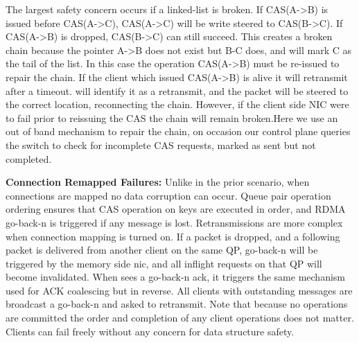 The largest safety concern occurs if a linked-list is broken.  If CAS(A->B) is
issued before CAS(A->C), CAS(A->C) will be write steered to CAS(B->C). If
CAS(A->B) is dropped, CAS(B->C) can still succeed. This creates a broken chain
because the pointer A->B does not exist but B-C does, and {\sword} will mark C
as the tail of the list. In this case the operation CAS(A->B) must be re-issued
to repair the chain.  If the client which issued CAS(A->B) is alive it will
retransmit after a timeout. {\sword} will identify it as a retransmit, and the
packet will be steered to the correct location, reconnecting the chain. However,
if the client side NIC were to fail prior to reissuing the CAS the chain will
remain broken.Here we use an out of band mechanism to repair the chain, on
occasion our control plane queries the switch to check for incomplete CAS
requests, marked as sent but not completed.

\textbf{Connection Remapped Failures:} Unlike in the prior scenario, when
connections are mapped no data corruption can occur. Queue pair operation
ordering ensures that CAS operation on keys are executed in order, and RDMA
go-back-n is triggered if any message is lost.  Retransmissions are more complex
when connection mapping is turned on. If a packet is dropped, and a following
packet is delivered from another client on the same QP, go-back-n will be
triggered by the memory side nic, and all inflight requests on that QP will
become invalidated. When {\sword} sees a go-back-n ack, it triggers the same
mechanism used for ACK coalescing but in reverse. All clients with outstanding
messages are broadcast a go-back-n and asked to retransmit. Note that because no
operations are committed the order and completion of any client operations does
not matter. Clients can fail freely without any concern for data structure
safety.


 

